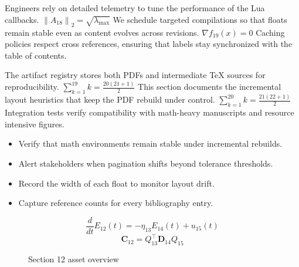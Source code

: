     Engineers rely on detailed telemetry to tune the performance of the Lua callbacks.  $\left\|A_{18}\right\|_{2} = \sqrt{\lambda_{\max}}$  We schedule targeted compilations so that floats remain stable even as content evolves across revisions.  $\nabla f_{19}(x) = 0$  Caching policies respect cross references, ensuring that labels stay synchronized with the table of contents.
    \par
  
    The artifact registry stores both PDFs and intermediate TeX sources for reproducibility.  $\sum_{k=1}^{19} k = \frac{20(21+1)}{2}$  This section documents the incremental layout heuristics that keep the PDF rebuild under control.  $\sum_{k=1}^{20} k = \frac{21(22+1)}{2}$  Integration tests verify compatibility with math-heavy manuscripts and resource intensive figures.
    \par
  
    \begin{itemize}
      
    \item Verify that math environments remain stable under incremental rebuilds.
    \item Alert stakeholders when pagination shifts beyond tolerance thresholds.
    \item Record the width of each float to monitor layout drift.
    \item Capture reference counts for every bibliography entry.
    \end{itemize}
\begin{equation}
\label{eq:sec12-eq1}
\frac{d}{dt} E_{12}(t) = -\eta_{13} E_{14}(t) + u_{15}(t)
\end{equation}
\[
\mathbf{C}_{12} = Q_{13}^{\top} \mathbf{D}_{14} Q_{15}
\]

    \begin{figure}[htbp]
      \centering
        \caption{Section 12 asset overview}
      
        \label{fig:fig-sec12}
      
    \end{figure}
  